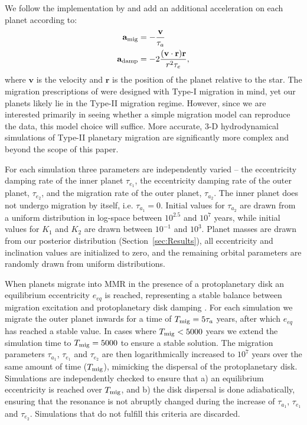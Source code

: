 We follow the implementation by \cite{Papaloizou2000} and add an additional acceleration on each planet according to:
\begin{align*}
\begin{split}
\textbf{a}_{\rm mig} &=  -\frac{\textbf{v}}{\tau_a} \\
\textbf{a}_{\rm damp} &= -2\frac{(\textbf{v}\cdot\textbf{r})\textbf{r}}{r^2\tau_e},
\end{split}
\end{align*}
where $\textbf{v}$ is the velocity and $\textbf{r}$ is the position of the planet relative to the star. 
The migration prescriptions of \citet{Papaloizou2000} were designed with Type-I migration in mind, yet our planets likely lie in the Type-II migration regime.
However, since we are interested primarily in seeing whether a simple migration model can reproduce the data, this model choice will suffice. 
More accurate, 3-D hydrodynamical simulations of Type-II planetary migration are significantly more complex and beyond the scope of this paper. 

For each simulation three parameters are independently varied -- the eccentricity damping rate of the inner planet $\tau_{e_1}$, the eccentricity damping rate of the outer planet, $\tau_{e_2}$, and the migration rate of the outer planet, $\tau_{a_2}$.
The inner planet does not undergo migration by itself, i.e. $\tau_{a_1} = 0$.
Initial values for $\tau_{a_2}$ are drawn from a uniform distribution in log-space between $10^{2.5}$ and $10^7$ years, while initial values for $K_1$ and $K_2$ are drawn between $10^{-1}$ and $10^3$.
Planet masses are drawn from our posterior distribution (Section~\ref{sec:Results}), all eccentricity and inclination values are initialized to zero, and the remaining orbital parameters are randomly drawn from uniform distributions. 

When planets migrate into MMR in the presence of a protoplanetary disk an equilibrium eccentricity $e_{eq}$ is reached, representing a stable balance between migration excitation and protoplanetary disk damping \citep[e.g.][]{Goldreich2014}. 
For each simulation we migrate the outer planet inwards for a time of $T_{\rm mig} = 5\tau_a$ years, after which $e_{eq}$ has reached a stable value. 
In cases where $T_{\rm mig} < 5000$ years we extend the simulation time to $T_{\rm mig} = 5000$ to ensure a stable solution. 
The migration parameters $\tau_{a_1}$, $\tau_{e_1}$ and $\tau_{e_2}$ are then logarithmically increased to $10^7$ years over the same amount of time ($T_{\rm mig}$), mimicking the dispersal of the protoplanetary disk. 
Simulations are independently checked to ensure that a) an equilibrium eccentricity is reached over $T_{\rm mig}$, and b) the disk dispersal is done adiabatically, ensuring that the resonance is not abruptly changed during the increase of $\tau_{a_1}$, $\tau_{e_1}$ and $\tau_{e_2}$.
Simulations that do not fulfill this criteria are discarded.

